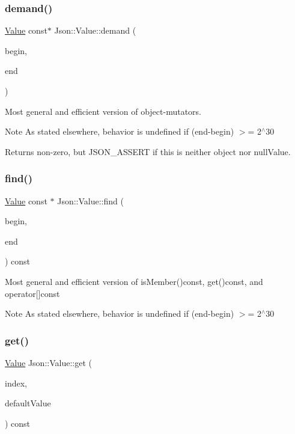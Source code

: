 \subsubsection{\texorpdfstring{demand()}{demand()}}
{\footnotesize\ttfamily \hyperlink{classJson_1_1Value}{Value} const$\ast$ Json\+::\+Value\+::demand (\begin{DoxyParamCaption}\item[{char const $\ast$}]{begin,  }\item[{char const $\ast$}]{end }\end{DoxyParamCaption})}

Most general and efficient version of object-\/mutators. \begin{DoxyNote}{Note}
As stated elsewhere, behavior is undefined if (end-\/begin) $>$= 2$^\wedge$30 
\end{DoxyNote}
\begin{DoxyReturn}{Returns}
non-\/zero, but J\+S\+O\+N\+\_\+\+A\+S\+S\+E\+RT if this is neither object nor null\+Value. 
\end{DoxyReturn}
\mbox{\label{classJson_1_1Value_afb007b9ce9b2cf9d5f667a07e5e0349f}} 
\subsubsection{\texorpdfstring{find()}{find()}}
{\footnotesize\ttfamily \hyperlink{classJson_1_1Value}{Value} const  $\ast$ Json\+::\+Value\+::find (\begin{DoxyParamCaption}\item[{char const $\ast$}]{begin,  }\item[{char const $\ast$}]{end }\end{DoxyParamCaption}) const}

Most general and efficient version of is\+Member()const, get()const, and operator\mbox{[}\mbox{]}const \begin{DoxyNote}{Note}
As stated elsewhere, behavior is undefined if (end-\/begin) $>$= 2$^\wedge$30 
\end{DoxyNote}
\mbox{\label{classJson_1_1Value_a034eb7bf85a44fa759bdaa232788ca66}} 
\subsubsection{\texorpdfstring{get()}{get()}\hspace{0.1cm}{\footnotesize\ttfamily [1/4]}}
{\footnotesize\ttfamily \hyperlink{classJson_1_1Value}{Value} Json\+::\+Value\+::get (\begin{DoxyParamCaption}\item[{Array\+Index}]{index,  }\item[{const \hyperlink{classJson_1_1Value}{Value} \&}]{default\+Value }\end{DoxyParamCaption}) const}

